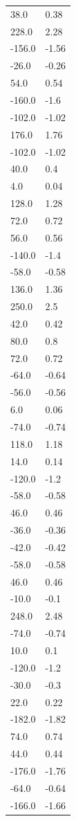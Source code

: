 \begin{longtable}{ll}
38.0 & 0.38 \\
228.0 & 2.28 \\
-156.0 & -1.56 \\
-26.0 & -0.26 \\
54.0 & 0.54 \\
-160.0 & -1.6 \\
-102.0 & -1.02 \\
176.0 & 1.76 \\
-102.0 & -1.02 \\
40.0 & 0.4 \\
4.0 & 0.04 \\
128.0 & 1.28 \\
72.0 & 0.72 \\
56.0 & 0.56 \\
-140.0 & -1.4 \\
-58.0 & -0.58 \\
136.0 & 1.36 \\
250.0 & 2.5 \\
42.0 & 0.42 \\
80.0 & 0.8 \\
72.0 & 0.72 \\
-64.0 & -0.64 \\
-56.0 & -0.56 \\
6.0 & 0.06 \\
-74.0 & -0.74 \\
118.0 & 1.18 \\
14.0 & 0.14 \\
-120.0 & -1.2 \\
-58.0 & -0.58 \\
46.0 & 0.46 \\
-36.0 & -0.36 \\
-42.0 & -0.42 \\
-58.0 & -0.58 \\
46.0 & 0.46 \\
-10.0 & -0.1 \\
248.0 & 2.48 \\
-74.0 & -0.74 \\
10.0 & 0.1 \\
-120.0 & -1.2 \\
-30.0 & -0.3 \\
22.0 & 0.22 \\
-182.0 & -1.82 \\
74.0 & 0.74 \\
44.0 & 0.44 \\
-176.0 & -1.76 \\
-64.0 & -0.64 \\
-166.0 & -1.66 \\

\end{longtable}
